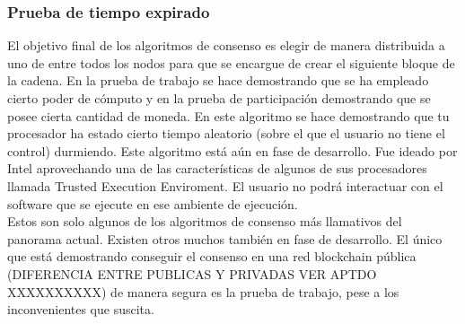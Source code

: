 \subsubsection{Prueba de tiempo expirado}
El objetivo final de los algoritmos de consenso es elegir de manera distribuida a uno de entre todos los nodos para que se encargue de crear el siguiente bloque de la cadena. En la prueba de trabajo se hace demostrando que se ha empleado cierto poder de cómputo y en la prueba de participación demostrando que se posee cierta cantidad de moneda. En este algoritmo se hace demostrando que tu procesador ha estado cierto tiempo aleatorio (sobre el que el usuario no tiene el control) durmiendo. Este algoritmo está aún en fase de desarrollo. Fue ideado por Intel aprovechando una de las características de algunos de sus procesadores llamada Trusted Execution Enviroment. El usuario no podrá interactuar con el software que se ejecute en ese ambiente de ejecución. \\
Estos son solo algunos de los algoritmos de consenso más llamativos del panorama actual. Existen otros muchos también en fase de desarrollo. El único que está demostrando conseguir el consenso en una red blockchain pública (DIFERENCIA ENTRE PUBLICAS Y PRIVADAS VER APTDO XXXXXXXXXX) de manera segura es la prueba de trabajo, pese a los inconvenientes que suscita.

